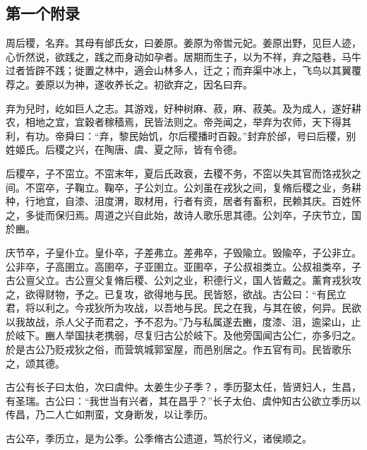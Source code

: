 \documentclass[UTF8,12pt,AutoFakeBold]{ctexart}
\begin{document}
	\begin{appendices}
		\setcounter{table}{0}
		\setcounter{figure}{0}
		\setcounter{equation}{0}
		\renewcommand{\thetable}{\thesection-\arabic{table}}
		\renewcommand{\theequation}{\thesection-\arabic{equation}}
		\renewcommand{\thefigure}{\thesection-\arabic{figure}}
		
		
		
		
		\section{第一个附录\label{附录：第一个附录}}
		周后稷，名弃。其母有邰氏女，曰姜原。姜原为帝喾元妃。姜原出野，见巨人迹，心忻然说，欲践之，践之而身动如孕者。居期而生子，以为不祥，弃之隘巷，马牛过者皆辟不践；徙置之林中，適会山林多人，迁之；而弃渠中冰上，飞鸟以其翼覆荐之。姜原以为神，遂收养长之。初欲弃之，因名曰弃。
		
		弃为兒时，屹如巨人之志。其游戏，好种树麻、菽，麻、菽美。及为成人，遂好耕农，相地之宜，宜穀者稼穑焉，民皆法则之。帝尧闻之，举弃为农师，天下得其利，有功。帝舜曰：“弃，黎民始饥，尔后稷播时百穀。”封弃於邰，号曰后稷，别姓姬氏。后稷之兴，在陶唐、虞、夏之际，皆有令德。
		
		后稷卒，子不窋立。不窋末年，夏后氏政衰，去稷不务，不窋以失其官而饹戎狄之间。不窋卒，子鞠立。鞠卒，子公刘立。公刘虽在戎狄之间，复脩后稷之业，务耕种，行地宜，自漆、沮度渭，取材用，行者有资，居者有畜积，民赖其庆。百姓怀之，多徙而保归焉。周道之兴自此始，故诗人歌乐思其德。公刘卒，子庆节立，国於豳。
		
		庆节卒，子皇仆立。皇仆卒，子差弗立。差弗卒，子毁隃立。毁隃卒，子公非立。公非卒，子高圉立。高圉卒，子亚圉立。亚圉卒，子公叔祖类立。公叔祖类卒，子古公亶父立。古公亶父复脩后稷、公刘之业，积德行义，国人皆戴之。薰育戎狄攻之，欲得财物，予之。已复攻，欲得地与民。民皆怒，欲战。古公曰：“有民立君，将以利之。今戎狄所为攻战，以吾地与民。民之在我，与其在彼，何异。民欲以我故战，杀人父子而君之，予不忍为。”乃与私属遂去豳，度漆、沮，逾梁山，止於岐下。豳人举国扶老携弱，尽复归古公於岐下。及他旁国闻古公仁，亦多归之。於是古公乃贬戎狄之俗，而营筑城郭室屋，而邑别居之。作五官有司。民皆歌乐之，颂其德。
		
		古公有长子曰太伯，次曰虞仲。太姜生少子季？，季历娶太任，皆贤妇人，生昌，有圣瑞。古公曰：“我世当有兴者，其在昌乎？”长子太伯、虞仲知古公欲立季历以传昌，乃二人亡如荆蛮，文身断发，以让季历。
		
		古公卒，季历立，是为公季。公季脩古公遗道，笃於行义，诸侯顺之。
		

\end{appendices}
\end{document}
